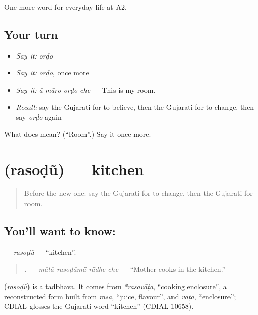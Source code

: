 \begin{grammarlens}[title={What you've built}]
One more word for everyday life at A2.
\end{grammarlens}

\subsection*{Your turn}
\begin{itemize}
\raggedright
  \item \emph{Say it:} \emph{orḍo}
  \item \emph{Say it:} \emph{orḍo}, once more
  \item \emph{Say it:} \emph{ā māro orḍo che} — This is my room.
  \item \emph{Recall:} say the Gujarati for to believe, then the Gujarati for to change, then say \emph{orḍo} again
\end{itemize}

\begin{tcolorbox}[breakable,colback=teal!4,colframe=teal!35!black,title={Before you move on}]
What does  mean? (\textquotedblleft{}Room\textquotedblright{}.) Say it once more.
\end{tcolorbox}
\section[\texorpdfstring{\gu{રસોડું} (rasoḍũ)}{રસોડું (rasoḍũ)}]{ (rasoḍũ) — kitchen}

\label{lesson:GU-C153-rasodu}



\begin{quote}
Before the new one: say the Gujarati for to change, then the Gujarati for room.
\end{quote}

\subsection*{You'll want to know: }
\textbf{} — \emph{rasoḍũ} — \textquotedblleft{}kitchen\textquotedblright{}.

\begin{quote}
\textbf{   .} — \emph{mātā rasoḍāmā̃ rā̃dhe che} — \textquotedblleft{}Mother cooks in the kitchen.\textquotedblright{}
\end{quote}

\begin{cousinweb}
\textbf{} (\emph{rasoḍũ}) is a tadbhava. It comes from \emph{*rasavāṭa}, \textquotedblleft{}cooking enclosure\textquotedblright{}, a reconstructed form built from \emph{rasa}, \textquotedblleft{}juice, flavour\textquotedblright{}, and \emph{vāṭa}, \textquotedblleft{}enclosure\textquotedblright{}; CDIAL glosses the Gujarati word \textquotedblleft{}kitchen\textquotedblright{} (CDIAL 10658).
\end{cousinweb}

